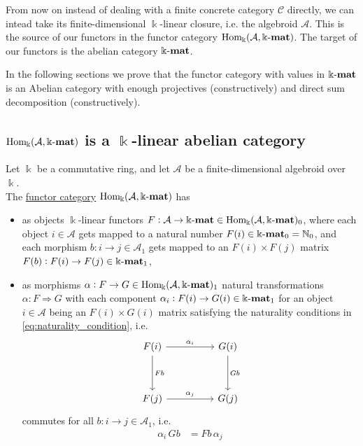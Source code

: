\label{sect:abelian_cat}
From now on instead of dealing with a finite concrete category $\mathcal{C}$ directly, we can intead take its finite-dimensional $\Bbbk$-linear
closure, i.e. the algebroid $\mathcal{A}$. This is the source of our functors in the functor category $\mathrm{Hom_{\Bbbk}}(\mathcal{A},\Bbbk\textnormal{-}\mathbf{mat})$. The target of
our functors is the abelian category $\Bbbk\textnormal{-}\mathbf{mat}$.

In the following sections we prove that the functor category with values in $\Bbbk\textnormal{-}\mathbf{mat}$ is an Abelian category with enough
projectives (constructively) and direct sum decomposition (constructively).

\subsection{$\mathrm{Hom_{\Bbbk}}(\mathcal{A},\Bbbk\textnormal{-}\mathbf{mat})$ is a $\Bbbk$-linear abelian category}

\begin{definition}
Let $\Bbbk$ be a commutative ring, and let $\mathcal{A}$ be a finite-dimensional algebroid over $\Bbbk$.\\
The \ul{functor category} $\mathrm{Hom_{\Bbbk}}(\mathcal{A},\Bbbk\textnormal{-}\mathbf{mat})$ has
\begin{itemize}
\item as objects $\Bbbk$-linear functors $F : \mathcal{A} \rightarrow \Bbbk\textnormal{-}\mathbf{mat} \in \mathrm{Hom_{\Bbbk}}(\mathcal{A},\Bbbk\textnormal{-}\mathbf{mat})_{0}$, where each
object $i \in \mathcal{A}$ gets mapped to a natural number $F(i) \in \Bbbk\textnormal{-}\mathbf{mat}_{0} = \mathbb{N}_{0}$, and each
morphism $b : i \rightarrow j \in \mathcal{A}_{1}$ gets mapped to an $F(i) \times F(j)$ matrix
$F(b) : F(i) \rightarrow F(j) \in \Bbbk\textnormal{-}\mathbf{mat}_{1}$,
\item as morphisms $\alpha : F \rightarrow G \in \mathrm{Hom_{\Bbbk}}(\mathcal{A},\Bbbk\textnormal{-}\mathbf{mat})_{1}$ natural transformations $\alpha : F \Rightarrow G$ with each component
$\alpha_{i} : F(i) \rightarrow G(i) \in \Bbbk\textnormal{-}\mathbf{mat}_{1}$ for an object $i \in \mathcal{A}$ being an $F(i) \times G(i)$ matrix satisfying the
naturality conditions in \eqref{eq:naturality_condition}, i.e.
\[
\begin{tikzcd}
F(i) \arrow[rr, "\alpha_{i}"] \arrow[dd, "Fb"] &  & G(i) \arrow[dd, "Gb"] \\
                                             &  &                     \\
F(j) \arrow[rr, "\alpha_{j}"]                &  & G(j)                
\end{tikzcd}
\]
commutes for all $b : i \rightarrow j \in \mathcal{A}_{1}$, i.e.
\begin{align}
\alpha_{i}\,Gb &= Fb\,\alpha_{j}
\end{align}
\end{itemize}
\end{definition}

